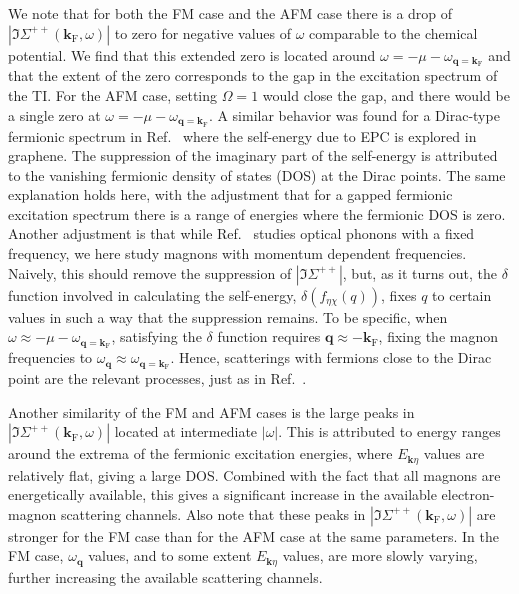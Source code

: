 \documentclass[aps, prb, twocolumn,amsmath,amssymb,floatfix]{revtex4-2}
\begin{document}
We note that for both the FM case and the AFM case there is a drop of $|\Im\Sigma^{++}(\boldsymbol{k}_{\textrm{F}}, \omega)|$ to zero for negative values of $\omega$ comparable to the chemical potential. We find that this extended zero is located around $\omega = -\mu - \omega_{\boldsymbol{q} = \boldsymbol{k}_{\textrm{F}}}$ and that the extent of the zero corresponds to the gap in the excitation spectrum of the TI. For the AFM case, setting $\Omega = 1$ would close the gap, and there would be a single zero at $\omega = -\mu - \omega_{\boldsymbol{q} = \boldsymbol{k}_{\textrm{F}}}$. A similar behavior was found for a Dirac-type fermionic spectrum in Ref.~\cite{elphcselfenergyprlpark} where the self-energy due to EPC is explored in graphene. The suppression of the imaginary part of the self-energy is attributed to the vanishing fermionic density of states (DOS) at the Dirac points. The same explanation holds here, with the adjustment that for a gapped fermionic excitation spectrum there is a range of energies where the fermionic DOS is zero. Another adjustment is that while Ref.~\cite{elphcselfenergyprlpark} studies optical phonons with a fixed frequency, we here study magnons with momentum dependent frequencies. Naively, this should remove the suppression of $|\Im\Sigma^{++}|$, but, as it turns out, the $\delta$ function involved in calculating the self-energy, $\delta(f_{\eta\chi}(q))$, fixes $q$ to certain values in such a way that the suppression remains. To be specific, when $\omega \approx -\mu - \omega_{\boldsymbol{q} = \boldsymbol{k}_{\textrm{F}}}$, satisfying the $\delta$ function requires $\boldsymbol{q} \approx -\boldsymbol{k}_{\textrm{F}}$, fixing the magnon frequencies to $\omega_{\boldsymbol{q}} \approx \omega_{\boldsymbol{q} = \boldsymbol{k}_{\textrm{F}}}$. Hence, scatterings with fermions close to the Dirac point are the relevant processes, just as in Ref.~\cite{elphcselfenergyprlpark}.

Another similarity of the FM and AFM cases is the large peaks in $|\Im\Sigma^{++}(\boldsymbol{k}_{\textrm{F}}, \omega)|$ located at intermediate $|\omega|$. This is attributed to energy ranges around the extrema of the fermionic excitation energies, where $E_{\boldsymbol{k}\eta}$ values are relatively flat, giving a large DOS. Combined with the fact that all magnons are energetically available, this gives a significant increase in the available electron-magnon scattering channels. Also note that these peaks in $|\Im\Sigma^{++}(\boldsymbol{k}_{\textrm{F}}, \omega)|$ are stronger for the FM case than for the AFM case at the same parameters. In the FM case, $\omega_{\boldsymbol{q}}$ values, and to some extent $E_{\boldsymbol{k}\eta}$ values, are more slowly varying, further increasing the available scattering channels.
\end{document}
